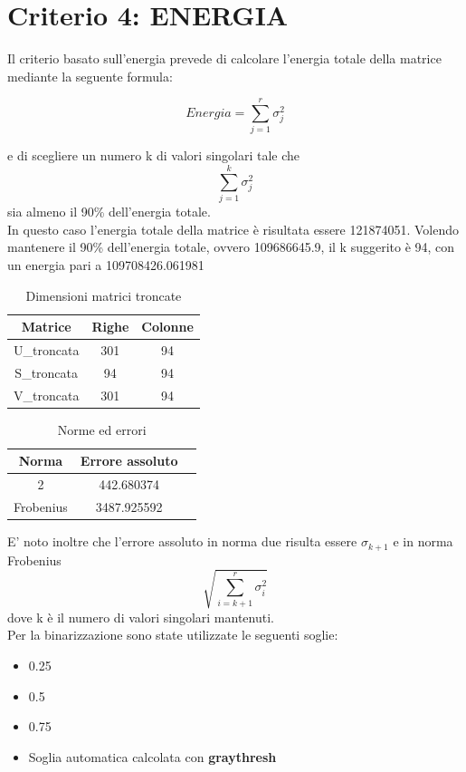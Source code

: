 \section{Criterio 4: ENERGIA}

Il criterio basato sull'energia prevede di calcolare l'energia totale della matrice mediante la seguente formula:

\begin{equation}
    Energia=\sum_{j=1}^r \sigma_j^2
\end{equation}

\noindent e di scegliere un numero k di valori singolari tale che 
\begin{equation}
    \sum_{j=1}^k \sigma_j^2
\end{equation}
sia almeno il 90\% dell'energia totale.\\

\noindent In questo caso l'energia totale della matrice è risultata essere 121874051. Volendo mantenere il 90\% dell'energia totale, ovvero 109686645.9,  il k suggerito è 94, con un energia pari a 109708426.061981
\begin{table}[H]
    \centering
    \begin{tabular}{|c|c|c|}
        \hline
        \textbf{Matrice} & \textbf{Righe} & \textbf{Colonne} \\
        \hline
        U\_troncata & 301 & 94 \\
        \hline
        S\_troncata & 94 & 94 \\
        \hline
        V\_troncata & 301 & 94 \\
        \hline
    \end{tabular}
    \caption{Dimensioni matrici troncate}
\end{table}

\begin{table}[H]
    \centering
    \begin{tabular}{|c|c|c|}
        \hline
        \textbf{Norma} & \textbf{Errore assoluto} \\
        \hline
        2 & 442.680374 \\
        \hline
        Frobenius & 3487.925592 \\
        \hline
    \end{tabular}
    \caption{Norme ed errori}
\end{table}

\noindent
E' noto inoltre che l'errore assoluto in norma due risulta essere $\sigma_{k+1}$ e in norma Frobenius 
\begin{equation}
    \sqrt{\sum_{i=k+1}^{r}\sigma_i^2}
\end{equation}
 dove k è il numero di valori singolari mantenuti.\\
Per la binarizzazione sono state utilizzate le seguenti soglie:
\begin{itemize}
    \item 0.25
    \item 0.5
    \item 0.75
    \item Soglia automatica calcolata con \textbf{graythresh}
\end{itemize}

